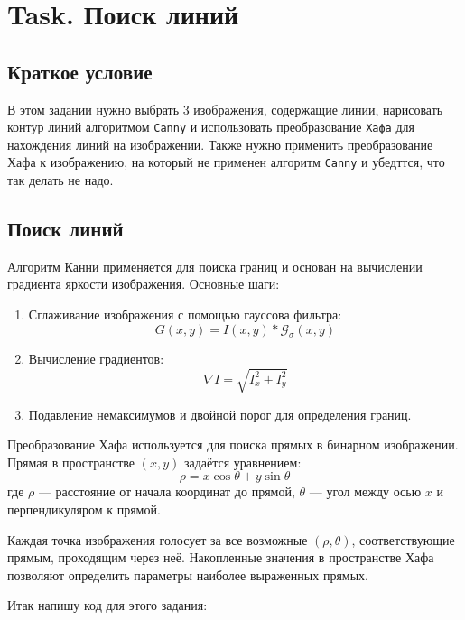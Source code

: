 \documentclass[a4paper,12pt]{article}
\begin{document}
	\section{Task. Поиск линий}
	\subsection{Краткое условие}
	В этом задании нужно выбрать 3 изображения, содержащие линии, нарисовать
	контур линий алгоритмом \texttt{Canny} и использовать преобразование 
	\texttt{Хафа} для нахождения линий на изображении. Также нужно применить преобразование Хафа к изображению, на который не применен алгоритм \texttt{Canny} и убедттся, что так делать не надо.
	
	\subsection{Поиск линий}
	
	Алгоритм Канни применяется для поиска границ и основан на вычислении градиента яркости изображения. Основные шаги:
	\begin{enumerate}
		\item Сглаживание изображения с помощью гауссова фильтра:
		\[
		G(x, y) = I(x, y) * \mathcal{G}_{\sigma}(x, y)
		\]
		\item Вычисление градиентов:
		\[
		\nabla I = \sqrt{I_x^2 + I_y^2}
		\]
		\item Подавление немаксимумов и двойной порог для определения границ.
	\end{enumerate}
	
	
	Преобразование Хафа используется для поиска прямых в бинарном изображении. Прямая в пространстве $(x, y)$ задаётся уравнением:
	\[
	\rho = x \cos \theta + y \sin \theta
	\]
	где $\rho$ — расстояние от начала координат до прямой, $\theta$ — угол между осью $x$ и перпендикуляром к прямой.
	
	Каждая точка изображения голосует за все возможные $(\rho, \theta)$, соответствующие прямым, проходящим через неё. Накопленные значения в пространстве Хафа позволяют определить параметры наиболее выраженных прямых.
	
	Итак напишу код для этого задания:
	
\end{document}
